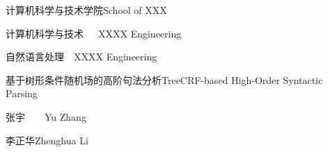 
\school
{计算机科学与技术学院}{School of XXX}

\major
{计算机科学与技术~~~}{XXXX Engineering}

\direct
{自然语言处理~~}{XXXX Engineering}

\thesistitle
{基于树形条件随机场的高阶句法分析}{TreeCRF-based High-Order Syntactic Parsing}

\thesisauthor
{张宇~~~~}{Yu Zhang}

\teacher
{李正华}{Zhenghua Li}





